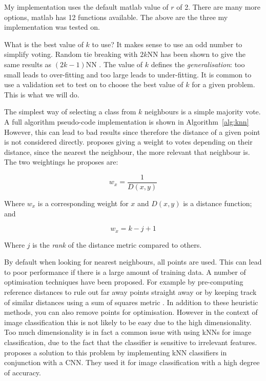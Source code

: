 \documentclass{article}
\begin{document}
\begin{multicols}{2}
My implementation uses the default matlab value of $r$ of 2.
There are many more options, matlab has 12 functions available. The above are the three my implementation was tested on.

What is the best value of $k$ to use? It makes sense to use an odd number to simplify voting. Random tie breaking with $2k$NN has been shown to give the same results as $(2k-1)$NN \citep{devijer}. The value of $k$ defines the \textit{generalisation}: too small leads to over-fitting and too large leads to under-fitting. It is common to use a validation set to test on to choose the best value of $k$ for a given problem. This is what we will do.

The simplest way of selecting a class from $k$ neighbours is a simple majority vote. A full algorithm pseudo-code implementation is shown in Algorithm~\ref{alg:knn} However, this can lead to bad results since therefore the distance of a given point is not considered directly. \cite{dudani} proposes giving a weight to votes depending on their distance, since the nearest the neighbour, the more relevant that neighbour is. The two weightings he proposes are:

\begin{equation}
	w_{x} = \frac{1}{D(x, y)}
\end{equation}

Where $w_{x}$ is a corresponding weight for $x$ and $D(x, y)$ is a distance function; and

\begin{equation}
	w_{x} = k - j + 1
\end{equation} 

Where $j$ is the \textit{rank} of the distance metric compared to others.

By default when looking for nearest neighbours, all points are used. This can lead to poor performance if there is a large amount of training data. A number of optimisation techniques have been proposed. For example by pre-computing reference distances to rule out far away points straight away \cite{orchard} or by keeping track of similar distances using a sum of squares metric \cite{gray}. In addition to these heuristic methods, you can also remove points for optimisation. However in the context of image classification this is not likely to be easy due to the high dimensionality. Too much dimensionality is in fact a common issue with using kNNs for image classification, due to the fact that the classifier is sensitive to irrelevant features. \cite{bhat} proposes a solution to this problem by implementing kNN classifiers in conjunction with a CNN. They used it for image classification with a high degree of accuracy.


\end{multicols}
\end{document}
